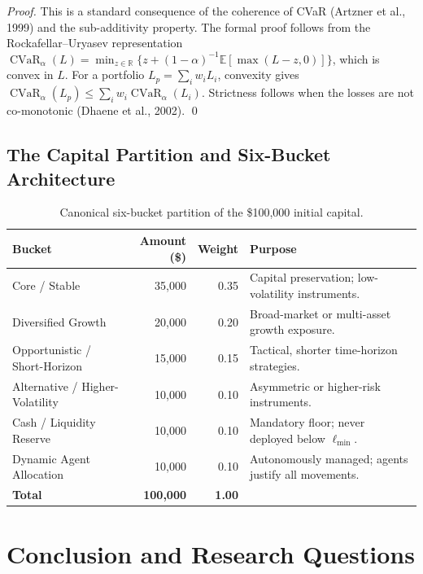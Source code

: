 \documentclass[12pt,openany]{book}
\DeclareMathOperator{\CVaR}{CVaR}
\numberwithin{equation}{chapter}
\theoremstyle{plain}
\theoremstyle{definition}
\theoremstyle{remark}
\begin{document}
\begin{proof}
This is a standard consequence of the coherence of CVaR
(Artzner et al., 1999) and the sub-additivity property.  The
formal proof follows from the Rockafellar--Uryasev representation
$\CVaR_\alpha(L) = \min_{z \in \mathbb{R}}\{z + (1-\alpha)^{-1}
\mathbb{E}[\max(L-z,0)]\}$, which is convex in $L$.  For a
portfolio $L_p = \sum_i w_i L_i$, convexity gives
$\CVaR_\alpha(L_p) \leq \sum_i w_i \CVaR_\alpha(L_i)$.
Strictness follows when the losses are not co-monotonic
(Dhaene et al., 2002).
\qed
\end{proof}

\section{The Capital Partition and Six-Bucket Architecture}

\begin{table}[H]
\centering
\caption{Canonical six-bucket partition of the \$100{,}000 initial
  capital.}
\label{tab:partition}
\small
\begin{tabularx}{\linewidth}{@{} l r r X @{}}
\toprule
\textbf{Bucket} & \textbf{Amount (\$)}
  & \textbf{Weight} & \textbf{Purpose} \\
\midrule
Core / Stable & 35{,}000 & 0.35
  & Capital preservation; low-volatility instruments. \\
Diversified Growth & 20{,}000 & 0.20
  & Broad-market or multi-asset growth exposure. \\
Opportunistic / Short-Horizon & 15{,}000 & 0.15
  & Tactical, shorter time-horizon strategies. \\
Alternative / Higher-Volatility & 10{,}000 & 0.10
  & Asymmetric or higher-risk instruments. \\
Cash / Liquidity Reserve & 10{,}000 & 0.10
  & Mandatory floor; never deployed below $\ell_{\min}$. \\
Dynamic Agent Allocation & 10{,}000 & 0.10
  & Autonomously managed; agents justify all movements. \\
\midrule
\textbf{Total} & \textbf{100{,}000} & \textbf{1.00} & \\
\bottomrule
\end{tabularx}
\end{table}

\chapter*{Conclusion and Research Questions}
\end{document}
